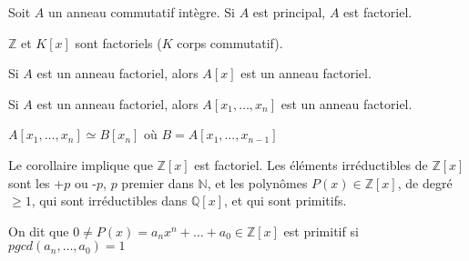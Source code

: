\documentclass[12pt,a4paper]{article}
\begin{document}
\begin{flushleft}
\begin{thm}
Soit $A$ un anneau commutatif intègre. Si $A$ est principal, $A$ est factoriel.
\end{thm}

\begin{cor}
$\mathbb{Z}$ et $K [x]$ sont factoriels ($K$ corps commutatif).
\end{cor}

\begin{thm}
Si $A$ est un anneau factoriel, alors $A[x]$ est un anneau factoriel.
\end{thm}

\begin{cor}
Si $A$ est un anneau factoriel, alors $A[x_1, \ldots , x_n]$ est un anneau factoriel.
\end{cor}

\begin{lem}
$A[x_1 , \ldots , x_n] \simeq B[x_n]$ où $B = A[x_1 , \ldots , x_{n-1}]$
\end{lem}

\begin{rem}
Le corollaire implique que $\mathbb{Z} [x]$ est factoriel. Les éléments irréductibles de $\mathbb{Z} [x]$ sont les +$p$ ou -$p$, $p$ premier dans $\mathbb{N}$, et les polynômes $P(x) \in \mathbb{Z} [x]$, de degré $\geq 1$, qui sont irréductibles dans $\mathbb{Q} [x]$, et qui sont primitifs. 
\end{rem}

\begin{rem}
On dit que $0 \neq P(x) = a_n x^n + \ldots + a_0 \in \mathbb{Z} [x]$ est primitif si $pgcd(a_n , \ldots , a_0) = 1$
\end{rem}



\end{flushleft}


 
\end{document}
